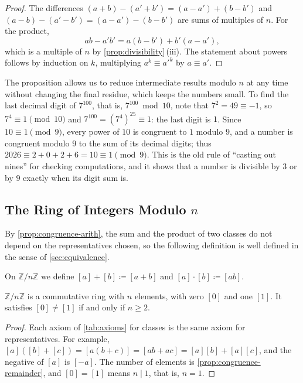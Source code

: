 \begin{proof}
The differences $(a+b)-(a'+b')=(a-a')+(b-b')$ and $(a-b)-(a'-b')=(a-a')-(b-b')$ are sums of multiples of $n$. For the product,
\[
ab-a'b'=a(b-b')+b'(a-a'),
\]
which is a multiple of $n$ by \cref{prop:divisibility}\,(iii). The statement about powers follows by induction on $k$, multiplying $a^k\equiv a'^k$ by $a\equiv a'$.
\end{proof}

The proposition allows us to reduce intermediate results modulo $n$ at any time without changing the final residue, which keeps the numbers small. To find the last decimal digit of $7^{100}$, that is, $7^{100}\bmod10$, note that $7^2=49\equiv-1$, so $7^4\equiv1\pmod{10}$ and $7^{100}=(7^4)^{25}\equiv1$: the last digit is $1$. Since $10\equiv1\pmod9$, every power of $10$ is congruent to $1$ modulo $9$, and a number is congruent modulo $9$ to the sum of its decimal digits; thus $2026\equiv2+0+2+6=10\equiv1\pmod9$. This is the old rule of ``casting out nines'' for checking computations, and it shows that a number is divisible by $3$ or by $9$ exactly when its digit sum is.

\subsection{The Ring of Integers Modulo $n$}

By \cref{prop:congruence-arith}, the sum and the product of two classes do not depend on the representatives chosen, so the following definition is well defined in the sense of \cref{sec:equivalence}.

\begin{definition}
\label{def:zn}
On $\mathbb Z/n\mathbb Z$ we define $[a]+[b]\coloneqq[a+b]$ and $[a]\cdot[b]\coloneqq[ab]$.
\end{definition}

\begin{theorem}
\label{thm:zn-ring}
$\mathbb Z/n\mathbb Z$ is a commutative ring with $n$ elements, with zero $[0]$ and one $[1]$. It satisfies $[0]\ne[1]$ if and only if $n\ge2$.
\end{theorem}

\begin{proof}
Each axiom of \cref{tab:axioms} for classes is the same axiom for representatives. For example, $[a]([b]+[c])=[a(b+c)]=[ab+ac]=[a][b]+[a][c]$, and the negative of $[a]$ is $[-a]$. The number of elements is \cref{prop:congruence-remainder}, and $[0]=[1]$ means $n\mid1$, that is, $n=1$.
\end{proof}

